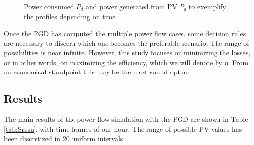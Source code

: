 \begin{figure}[!htb]
\begin{subfigure}[!htb]{0.45\textwidth}
    \end{subfigure}
  \caption{Power consumed $P_d$ and power generated from PV $P_g$ to exemplify the profiles depending on time}
  \label{fig:pgpd}
\end{figure}
Once the PGD has computed the multiple power flow cases, some decision rules are necessary to discern which one becomes the preferable scenario. The range of possibilities is near infinite. However, this study focuses on minimizing the losses, or in other words, on maximizing the efficiency, which we will denote by $\eta$. From an economical standpoint this may be the most sound option. 


\subsection{Results}
The main results of the power flow simulation with the PGD are shown in Table \ref{tab:Sresu}, with time frames of one hour. The range of possible PV values has been discretized in 20 uniform intervals. 

